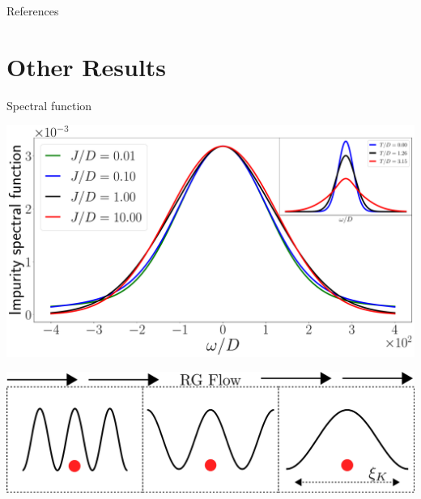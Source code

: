 \documentclass[aspectratio=169]{beamer}
\begin{document}
\begin{frame}{References}
\printbibliography
\end{frame}

\section{Other Results}
\begin{frame}[noframenumbering]{Spectral function}
\begin{minipage}{0.45\textwidth}
\includegraphics[width=\textwidth]{figures/kondo_spec_func.pdf}
\end{minipage}
\begin{minipage}{0.45\textwidth}
\includegraphics[width=\textwidth]{figures/Kondo_length.pdf}
\end{minipage}
\end{frame}
\end{document}
